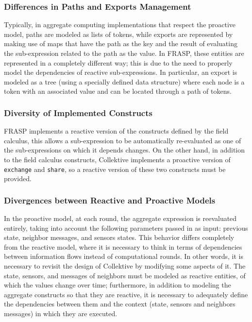 \subsubsection{Differences in Paths and Exports Management}

Typically, in aggregate computing implementations that respect the proactive model, paths are modeled as lists of tokens, while exports are represented by making use of maps that have the path as the key and the result of evaluating the sub-expression related to the path as the value.
In FRASP, these entities are represented in a completely different way; this is due to the need to properly model the dependencies of reactive sub-expressions. In particular, an export is modeled as a tree (using a specially defined data structure) where each node is a token with an associated value and can be located through a path of tokens.

\subsubsection{Diversity of Implemented Constructs}

FRASP implements a reactive version of the constructs defined by the field calculus, this allows a sub-expression to be automatically re-evaluated as one of the sub-expressions on which it depends changes. On the other hand, in addition to the field calculus constructs, Collektive implements a proactive version of \texttt{exchange} and \texttt{share}, so a reactive version of these two constructs must be provided.

\subsubsection{Divergences between Reactive and Proactive Models}

In the proactive model, at each round, the aggregate expression is reevaluated entirely, taking into account the following parameters passed in as input: previous state, neighbor messages, and sensors states. This behavior differs completely from the reactive model, where it is necessary to think in terms of dependencies between information flows instead of computational rounds. In other words, it is necessary to revisit the design of Collektive by modifying some aspects of it. The state, sensors, and messages of neighbors must be modeled as reactive entities, of which the values change over time; furthermore, in addition to modeling the aggregate constructs so that they are reactive, it is necessary to adequately define the dependencies between them and the context (state, sensors and neighbors messages) in which they are executed.

